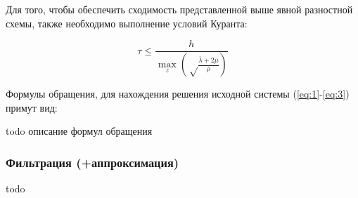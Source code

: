Для того, чтобы обеспечить сходимость представленной выше явной разностной схемы, также необходимо выполнение условий Куранта:

\begin{equation}
\label{eq:10}
\tau \leq \frac{h}{\max\limits_z\left(\sqrt\frac{\overline\lambda + 2\overline\mu}{\overline\rho}\right)}
\end{equation}

Формулы обращения, для нахождения решения исходной системы (\ref{eq:1}-\ref{eq:3}) примут вид:

todo описание формул обращения

\subsubsection{Фильтрация (+аппроксимация)}
todo

\clearpage